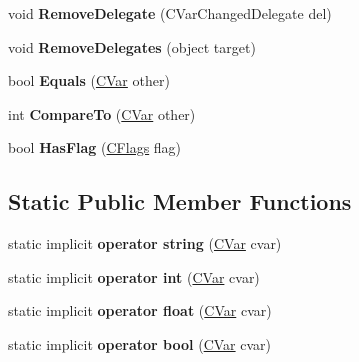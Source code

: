 \begin{DoxyCompactItemize}
\mbox{\label{class_lunar_console_plugin_1_1_c_var_ab7d7a566a89fe178b0df17f65eaa6f07}} 
void {\bfseries Remove\+Delegate} (C\+Var\+Changed\+Delegate del)
\item 
\mbox{\label{class_lunar_console_plugin_1_1_c_var_a29ee03194926db1e6494fede2b09e6b0}} 
void {\bfseries Remove\+Delegates} (object target)
\item 
\mbox{\label{class_lunar_console_plugin_1_1_c_var_a652dcb1bdccc8f2b268fdcf0eaa616c9}} 
bool {\bfseries Equals} (\mbox{\hyperlink{class_lunar_console_plugin_1_1_c_var}{C\+Var}} other)
\item 
\mbox{\label{class_lunar_console_plugin_1_1_c_var_ab937d843ef735c30792f4bc8fbc43d87}} 
int {\bfseries Compare\+To} (\mbox{\hyperlink{class_lunar_console_plugin_1_1_c_var}{C\+Var}} other)
\item 
\mbox{\label{class_lunar_console_plugin_1_1_c_var_a21681e4afd8d80fa8d49fbc6d2809f03}} 
bool {\bfseries Has\+Flag} (\mbox{\hyperlink{namespace_lunar_console_plugin_a7964ca4d001fe88527b3c508f034b34c}{C\+Flags}} flag)
\end{DoxyCompactItemize}
\subsection*{Static Public Member Functions}
\begin{DoxyCompactItemize}
\item 
\mbox{\label{class_lunar_console_plugin_1_1_c_var_ae4968cdf65db5180881869f837905515}} 
static implicit {\bfseries operator string} (\mbox{\hyperlink{class_lunar_console_plugin_1_1_c_var}{C\+Var}} cvar)
\item 
\mbox{\label{class_lunar_console_plugin_1_1_c_var_a843d5992b94e8e8e887c5dcc3dfeba90}} 
static implicit {\bfseries operator int} (\mbox{\hyperlink{class_lunar_console_plugin_1_1_c_var}{C\+Var}} cvar)
\item 
\mbox{\label{class_lunar_console_plugin_1_1_c_var_a2629057c15410b7fd4853a70a15689ff}} 
static implicit {\bfseries operator float} (\mbox{\hyperlink{class_lunar_console_plugin_1_1_c_var}{C\+Var}} cvar)
\item 
\mbox{\label{class_lunar_console_plugin_1_1_c_var_a4ca4d5552b2fc00c7bc59ec710c6e70a}} 
static implicit {\bfseries operator bool} (\mbox{\hyperlink{class_lunar_console_plugin_1_1_c_var}{C\+Var}} cvar)
\end{DoxyCompactItemize}
